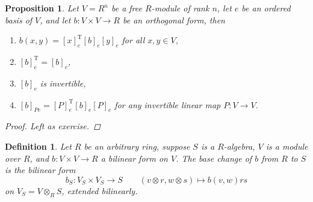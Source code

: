 \documentclass[10pt]{book}
\theoremstyle{bookplain}
\newtheorem{proposition}[theorem]{Proposition}
\theoremstyle{bookdefinition}
\newtheorem{definition}[theorem]{Definition}
\theoremstyle{bookremark}
\begin{document}
\begin{proposition}Let $V=R^n$ be a free $R$-module of rank $n$, let $e$ be an ordered basis of $V$, and let $b:V\times V\rightarrow R$ be an orthogonal form, then
    \begin{enumerate}
        \item $b(x,y)=[x]_{e}^\mathrm{T} [b]_e [y]_e$ for all $x,y\in V$,
        \item $[b]_e^{\mathrm{T}}=[b]_e$,
        \item  $[b]_e$ is invertible,
        \item $[b]_{Pe}=[P]^{\mathrm{T}}_e[b]_e[P]_e$ for any invertible linear map $P:V\rightarrow V$.
    \end{enumerate}
    \begin{proof}Left as exercise.
    \end{proof}
\end{proposition}


\begin{definition}Let $R$ be an arbitrary ring, suppose $S$ is a $R$-algebra, $V$ is a module over $R$, and $b:V\times V\rightarrow R$ a bilinear form on $V$. 
    The \textit{base change} of $b$ from $R$ to $S$ is the bilinear form 
    \[b_S:V_S\times V_S\rightarrow S\qquad (v\otimes r,w\otimes s)\mapsto b(v,w)rs \]
    on $V_S=V\otimes_RS$, extended bilinearly. 
\end{definition}
\end{document}
